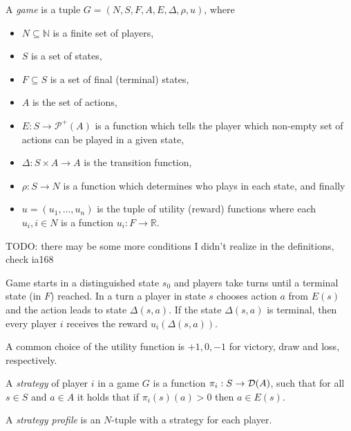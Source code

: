 \begin{definition}
    A {\em game} is a tuple $G = (N, S, F, A, E, \Delta, \rho, u)$,
    where
    \begin{itemize}
        \item $N \subseteq \mathbb{N}$ is a finite set of players,
        \item $S$ is a set of states,
        \item $F \subseteq S$ is a set of final (terminal) states,
        \item $A$ is the set of actions,
        \item $E : S \to \mathcal{P}^+(A)$ is a function which tells the player
            which non-empty set of actions can be played in a given state,
        \item $\Delta : S \times A \to A$ is the transition function,
        \item $\rho : S \to N$ is a function which determines who plays in each state,
            and finally
        \item $u = (u_1,\ldots,u_n)$ is the tuple of
            utility (reward) functions where each $u_i, i \in N$ is a function
            $u_i : F \to \mathbb{R}$.
    \end{itemize}
\end{definition}

TODO: there may be some more conditions I didn't realize in the definitions, check
ia168

Game starts in a distinguished state $s_0$ and players take turns until
a terminal state (in $F$) reached. In a turn a player in state $s$ chooses
action $a$ from $E(s)$ and the action leads to state $\Delta(s,a)$.
If the state $\Delta(s,a)$ is terminal, then every player $i$ receives
the reward $u_i(\Delta(s,a))$.

A common choice of the utility function is $+1, 0, -1$ for victory, draw
and loss, respectively.

\begin{example}
\end{example}

\begin{definition}
    A {\em strategy} of player $i$ in a game $G$ is a function
    $\pi_i : S \to \mathcal{D}(A)$, such that for all $s \in S$ and $a
    \in A$ it holds that if $\pi_i(s)(a) > 0$ then $a \in E(s)$.

    A {\em strategy profile} is an $N$-tuple with a strategy for each player.
\end{definition}

